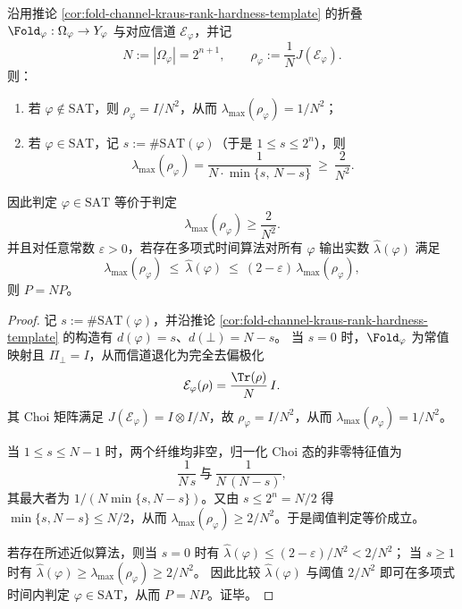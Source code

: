 \begin{theorem}\label{thm:fold-choi-maxeig-approx-sat-hard}
沿用推论 \ref{cor:fold-channel-kraus-rank-hardness-template} 的折叠 \(\Fold_\varphi:\Omega_\varphi\to Y_\varphi\) 与对应信道 \(\mathcal E_\varphi\)，并记
\[
N:=|\Omega_\varphi|=2^{n+1},
\qquad
\rho_\varphi:=\frac{1}{N}J(\mathcal E_\varphi).
\]
则：
\begin{enumerate}
  \item 若 \(\varphi\notin\mathrm{SAT}\)，则 \(\rho_\varphi=I/N^2\)，从而 \(\lambda_{\max}(\rho_\varphi)=1/N^2\)；
  \item 若 \(\varphi\in\mathrm{SAT}\)，记 \(s:=\#\mathrm{SAT}(\varphi)\)（于是 \(1\le s\le 2^n\)），则
  \[
  \lambda_{\max}(\rho_\varphi)=\frac{1}{N\cdot \min\{s,\,N-s\}}\ \ge\ \frac{2}{N^2}.
  \]
\end{enumerate}
因此判定 \(\varphi\in\mathrm{SAT}\) 等价于判定
\[
\lambda_{\max}(\rho_\varphi)\ge \frac{2}{N^2}.
\]
并且对任意常数 \(\varepsilon>0\)，若存在多项式时间算法对所有 \(\varphi\) 输出实数 \(\widehat\lambda(\varphi)\) 满足
\[
\lambda_{\max}(\rho_\varphi)\ \le\ \widehat\lambda(\varphi)\ \le\ (2-\varepsilon)\,\lambda_{\max}(\rho_\varphi),
\]
则 \(P=NP\)。
\end{theorem}
\begin{proof}
记 \(s:=\#\mathrm{SAT}(\varphi)\)，并沿推论 \ref{cor:fold-channel-kraus-rank-hardness-template} 的构造有 \(d(\varphi)=s\)、\(d(\bot)=N-s\)。
当 \(s=0\) 时，\(\Fold_\varphi\) 为常值映射且 \(\Pi_\bot=I\)，从而信道退化为完全去偏极化
\[
\mathcal E_\varphi(\rho)=\frac{\Tr(\rho)}{N}\,I.
\]
其 Choi 矩阵满足 \(J(\mathcal E_\varphi)=I\otimes I/N\)，故 \(\rho_\varphi=I/N^2\)，从而 \(\lambda_{\max}(\rho_\varphi)=1/N^2\)。

当 \(1\le s\le N-1\) 时，两个纤维均非空，归一化 Choi 态的非零特征值为
\[
\frac{1}{N\,s}\ \text{与}\ \frac{1}{N\,(N-s)},
\]
其最大者为 \(1/(N\min\{s,N-s\})\)。又由 \(s\le 2^n=N/2\) 得 \(\min\{s,N-s\}\le N/2\)，从而 \(\lambda_{\max}(\rho_\varphi)\ge 2/N^2\)。于是阈值判定等价成立。

若存在所述近似算法，则当 \(s=0\) 时有
\(
\widehat\lambda(\varphi)\le (2-\varepsilon)/N^2<2/N^2
\)；
当 \(s\ge 1\) 时有
\(
\widehat\lambda(\varphi)\ge \lambda_{\max}(\rho_\varphi)\ge 2/N^2
\)。
因此比较 \(\widehat\lambda(\varphi)\) 与阈值 \(2/N^2\) 即可在多项式时间内判定 \(\varphi\in\mathrm{SAT}\)，从而 \(P=NP\)。证毕。
\end{proof}

